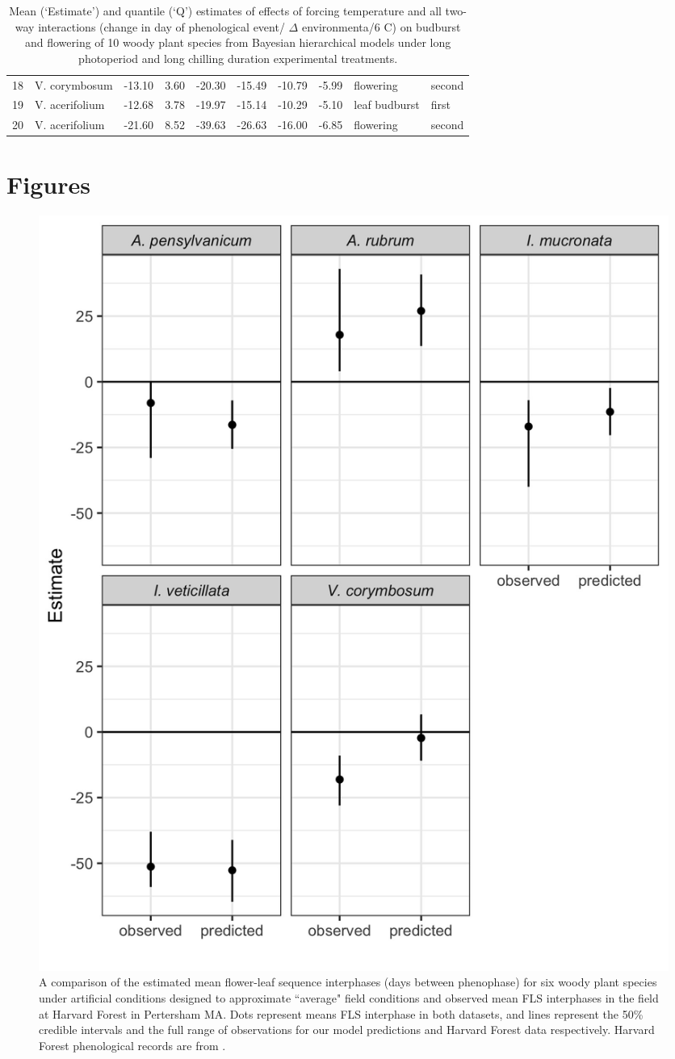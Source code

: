 \documentclass{article}\usepackage[]{graphicx}\usepackage[]{color}
\begin{document}
\begin{table}[ht]
\begin{tabular}{rlrrrrrrll}
  18 & V. corymbosum & -13.10 & 3.60 & -20.30 & -15.49 & -10.79 & -5.99 & flowering & second \\ 
  19 & V. acerifolium & -12.68 & 3.78 & -19.97 & -15.14 & -10.29 & -5.10 & leaf budburst & first \\ 
  20 & V. acerifolium & -21.60 & 8.52 & -39.63 & -26.63 & -16.00 & -6.85 & flowering & second \\ 
   \hline
\end{tabular}
\caption{Mean (`Estimate') and quantile (`Q') estimates of effects of forcing temperature and all two-way interactions (change in day of phenological event/ $\Delta$ environmenta/6 \degree C) on budburst and flowering of 10 woody plant species from Bayesian hierarchical models under long photoperiod and long chilling duration experimental treatments.}
\label{tab:phh}

\end{table}




\section*{Figures}

 \begin{figure}[!ht]
    \centering
 \includegraphics[width=.8\textwidth]{..//Plots/fieldmodcomparisions.jpeg}
    \caption{A comparison of the estimated mean flower-leaf sequence interphases (days between phenophase) for six woody plant species under artificial conditions designed to approximate ``average" field conditions and observed mean FLS interphases in the field at Harvard Forest in Pertersham MA. Dots represent means FLS interphase in both datasets, and lines represent the 50\% credible intervals and the full range of observations for our model predictions and Harvard Forest data respectively. Harvard Forest phenological records are from \citet{Okeefe2015}.}
    \label{fig:validate}
\end{figure}
\end{document}

